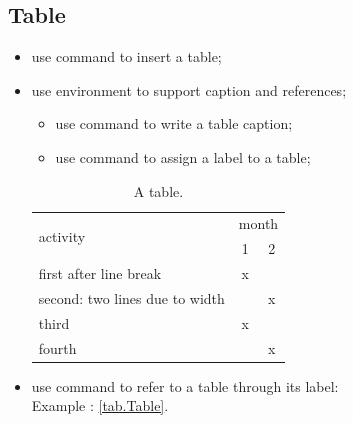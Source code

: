 \documentclass[report,english]{enacom}
\begin{document}
\subsection{Table}
	\begin{itemize}
		\item use command  to insert a table;
		\item use environment  to support caption and references;
		\begin{itemize}
			\item use command  to write a table caption;
			\item use command  to assign a label to a table;
		\end{itemize}
	\begin{table}[H]				
		\begin{tabular}{m{4cm}cc}
			\multirow{2}{*}{activity} & 
			\multicolumn{2}{c}{month}\\ & 1 & 2 \\ \hline
			first \linebreak
			after line break & x &   \\
			second: two lines due to width
			&   & x \\
		    third  & x &   \\
			fourth &   & x \\
		\end{tabular}
		\caption{A table.}
		\label{tab.Table}
	\end{table}
    \item use command  to refer to a table through its label:\\
    Example : \autoref{tab.Table}.
\end{itemize}
\end{document}
